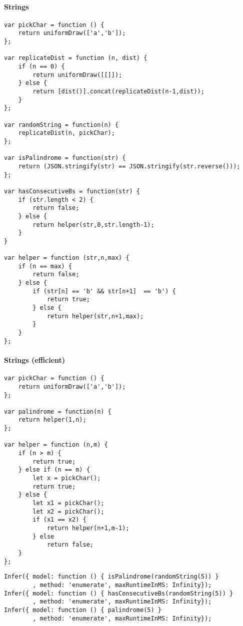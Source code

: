 \paragraph{Strings}

\begin{verbatim}
var pickChar = function () {
    return uniformDraw(['a','b']);
};

var replicateDist = function (n, dist) {
    if (n == 0) {
        return uniformDraw([[]]);
    } else {
        return [dist()].concat(replicateDist(n-1,dist));
    }
};

var randomString = function(n) {
    replicateDist(n, pickChar);
};

var isPalindrome = function(str) {
    return (JSON.stringify(str) == JSON.stringify(str.reverse()));
};

var hasConsecutiveBs = function(str) {
    if (str.length < 2) {
        return false;
    } else {
        return helper(str,0,str.length-1);
    }
}

var helper = function (str,n,max) {
    if (n == max) {
        return false;
    } else {
        if (str[n] == 'b' && str[n+1]  == 'b') {
            return true;
        } else {
            return helper(str,n+1,max);
        }
    }
};
\end{verbatim}

\paragraph{Strings (efficient)}

\begin{verbatim}
var pickChar = function () {
    return uniformDraw(['a','b']);
};

var palindrome = function(n) {
    return helper(1,n);
};

var helper = function (n,m) {
    if (n > m) {
        return true;
    } else if (n == m) {
        let x = pickChar();
        return true;
    } else {
        let x1 = pickChar();
        let x2 = pickChar();
        if (x1 == x2) {
            return helper(n+1,m-1);
        } else
            return false;
    }
};
\end{verbatim}

\begin{verbatim}
Infer({ model: function () { isPalindrome(randomString(5)) }
        , method: 'enumerate', maxRuntimeInMS: Infinity});
Infer({ model: function () { hasConsecutiveBs(randomString(5)) }
        , method: 'enumerate', maxRuntimeInMS: Infinity});
Infer({ model: function () { palindrome(5) }
        , method: 'enumerate', maxRuntimeInMS: Infinity});
\end{verbatim}


